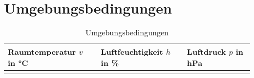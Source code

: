 \section{Umgebungsbedingungen}

\begin{table}[h]

	\caption{Umgebungsbedingungen}
	\begin{tabular}{|L{5cm}|L{5cm}|L{5cm}|} 
		\hline
		Raumtemperatur $v$ in °C & Luftfeuchtigkeit $h$ in \% & Luftdruck $p$ in hPa \\  \hline
 		\Temperatur & \Luftfeuchtigkeit & \Luftdruck  \\ \hline
	\end{tabular}
\end{table}
